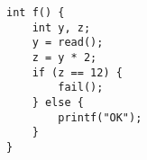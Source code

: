 \begin{lstlisting}[style=CStyle, caption=Symbolic Execution Example., label=symbolic]
int f() {
	int y, z;
	y = read();
	z = y * 2;
	if (z == 12) {
		fail();
	} else {
		printf("OK");
	}
}
\end{lstlisting}
